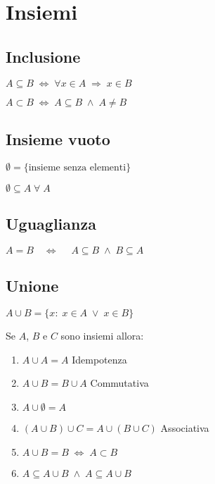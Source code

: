\chapter{Insiemi}
\section{Inclusione}
\begin{defn}[Sottoinsieme]
$A\subseteq B\; \Leftrightarrow\; \forall x\in A\;\Rightarrow\; x\in B$ 
\end{defn}
{\centering
	
	\par}
\begin{defn}
$A\subset B\; \Leftrightarrow\; A\subseteq B\; \wedge \; A\neq B$
\end{defn}
\section{Insieme vuoto}
\begin{defn}
$\emptyset=\lbrace\text{insieme senza elementi}\rbrace$
\end{defn}
\begin{thm}
$\emptyset\subseteq A\;\forall\; A$
\end{thm}
\section{Uguaglianza}
\begin{defn}[Uguaglianza]
	$A=B\quad\Longleftrightarrow\quad\; A\subseteq B\;\wedge\; B\subseteq A$
\end{defn}
\section{Unione}
\begin{defn}[Unione]
$A\cup B=\lbrace x:\;x\in A\;\vee\; x\in B\rbrace$
\end{defn}
{\centering
	
\par}
\begin{thm}
	Se $A$, $B$ e $C$ sono insiemi allora:
	\begin{enumerate}
		\item $A\cup A=A$ Idempotenza
		\item $A\cup B=B\cup A$ Commutativa
		\item $A\cup\emptyset=A$
		\item $\left(A\cup B\right)\cup C=A\cup\left(B\cup C\right)$ Associativa
		\item $A\cup B=B\;\Leftrightarrow\; A\subset B$
		\item $A\subseteq A\cup B\;\wedge\;A\subseteq A\cup B$ 
	\end{enumerate}
\end{thm}
